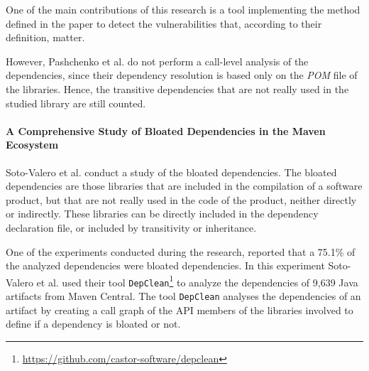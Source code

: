 One of the main contributions of this research is a tool implementing the method defined in the paper to detect the vulnerabilities that, according to their definition, matter.

However, Pashchenko et al. do not perform a call-level analysis of the dependencies, since their dependency resolution is based only on the \textit{POM} file of the libraries. Hence, the transitive dependencies that are not really used in the studied library are still counted.

\paragraph{A Comprehensive Study of Bloated Dependencies in the Maven Ecosystem \cite{soto2020comprehensive}}
Soto-Valero et al. conduct a study of the bloated dependencies. The bloated dependencies are those libraries that are included in the compilation of a software product, but that are not really used in the code of the product, neither directly or indirectly. These libraries can be directly included in the dependency declaration file, or included by transitivity or inheritance.

One of the experiments conducted during the research, reported that a 75.1\% of the analyzed dependencies were bloated dependencies. In this experiment Soto-Valero et al. used their tool \texttt{DepClean}\footnote{\href{https://github.com/castor-software/depclean}{https://github.com/castor-software/depclean}} to analyze the dependencies of 9,639 Java artifacts from Maven Central.
The tool \texttt{DepClean} analyses the dependencies of an artifact by creating a call graph of the API members of the libraries involved to define if a dependency is bloated or not.



